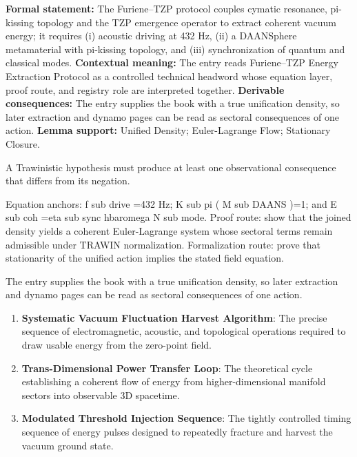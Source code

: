 \begingroup\footnotesize\setlength{\emergencystretch}{3em}\sloppy
\textbf{Formal statement:} The Furiene--TZP protocol couples cymatic resonance, pi-kissing topology and the TZP emergence operator to extract coherent vacuum energy; it requires (i) acoustic driving at 432 Hz, (ii) a DAANSphere metamaterial with pi-kissing topology, and (iii) synchronization of quantum and classical modes. \textbf{Contextual meaning:} The entry reads Furiene--TZP Energy Extraction Protocol as a controlled technical headword whose equation layer, proof route, and registry role are interpreted together. \textbf{Derivable consequences:} The entry supplies the book with a true unification density, so later extraction and dynamo pages can be read as sectoral consequences of one action. \textbf{Lemma support:} Unified Density; Euler-Lagrange Flow; Stationary Closure.\par
\endgroup

A Trawinistic hypothesis must produce at least one observational consequence that differs from its negation.

Equation anchors: f sub drive =432 Hz; K sub pi ( M sub DAANS )=1; and E sub coh =eta sub sync hbaromega N sub mode. Proof route: show that the joined density yields a coherent Euler-Lagrange system whose sectoral terms remain admissible under TRAWIN normalization. Formalization route: prove that stationarity of the unified action implies the stated field equation.

The entry supplies the book with a true unification density, so later extraction and dynamo pages can be read as sectoral consequences of one action.
\endgroup

\begin{enumerate}[leftmargin=1.6em,itemsep=6pt,topsep=4pt]
\item \textbf{Systematic Vacuum Fluctuation Harvest Algorithm}: The precise sequence of electromagnetic, acoustic, and topological operations required to draw usable energy from the zero-point field.
\item \textbf{Trans-Dimensional Power Transfer Loop}: The theoretical cycle establishing a coherent flow of energy from higher-dimensional manifold sectors into observable 3D spacetime.
\item \textbf{Modulated Threshold Injection Sequence}: The tightly controlled timing sequence of energy pulses designed to repeatedly fracture and harvest the vacuum ground state.
\end{enumerate}

